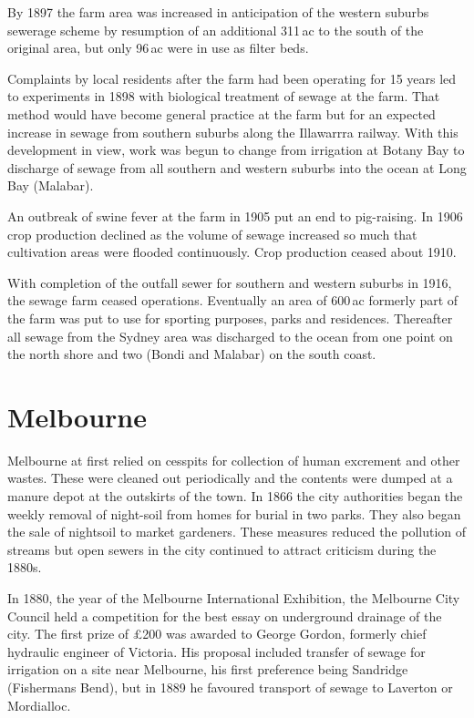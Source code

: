 By 1897 the farm area was increased in anticipation of the western
suburbs sewerage scheme by resumption of an additional 311\,ac to the
south of the original area, but only 96\,ac were in use as filter
beds.

Complaints by local residents after the farm had been operating for 15
years led to experiments in 1898 with biological treatment of sewage
at the farm.  That method would have become general practice at the
farm but for an expected increase in sewage from southern suburbs
along the Illawarrra railway.  With this development in view, work was
begun to change from irrigation at Botany Bay to discharge of sewage
from all southern and western suburbs into the ocean at Long Bay
(Malabar).

An outbreak of swine fever at the farm in 1905 put an end to
pig-raising.  In 1906 crop production declined as the volume of sewage
increased so much that cultivation areas were flooded continuously.
Crop production ceased about 1910.

With completion of the outfall sewer for southern and western suburbs
in 1916, the sewage farm ceased operations.  Eventually an area of
600\,ac formerly part of the farm was put to use for sporting
purposes, parks and residences.  Thereafter all sewage from the Sydney
area was discharged to the ocean from one point on the north shore and
two (Bondi and Malabar) on the south coast.

\section*{Melbourne}

Melbourne at first relied on cesspits for collection of human
excrement and other wastes.  These were cleaned out periodically and
the contents were dumped at a manure depot at the outskirts of the
town.  In 1866 the city authorities began the weekly removal of
night-soil from homes for burial in two parks.  They also began the
sale of nightsoil to market gardeners.  These measures reduced the
pollution of streams but open sewers in the city continued to attract
criticism during the 1880s.

In 1880, the year of the Melbourne International Exhibition, the
Melbourne City Council held a competition for the best essay on
underground drainage of the city.  The first prize of \pounds200 was
awarded to George Gordon, formerly chief hydraulic engineer of
Victoria.  His proposal included transfer of sewage for irrigation on
a site near Melbourne, his first preference being Sandridge
(Fishermans Bend), but in 1889 he favoured transport of sewage to
Laverton or Mordialloc.

